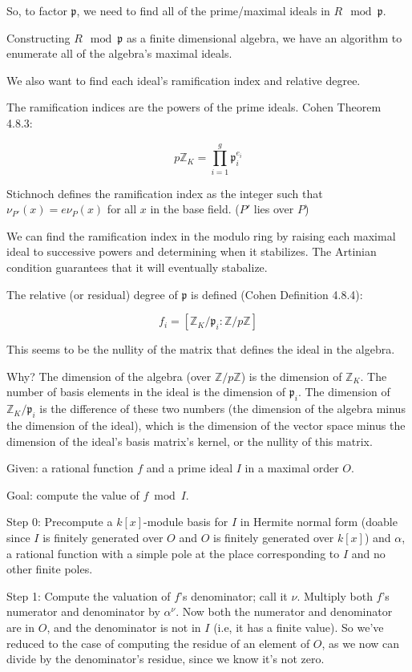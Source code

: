 So, to factor $\mathfrak{p}$, we need to find all of the prime/maximal ideals
in $R \mod \mathfrak{p}$.

Constructing $R \mod \mathfrak{p}$ as a finite dimensional algebra,
we have an algorithm to enumerate all of the algebra's maximal ideals.

We also want to find each ideal's ramification index and relative degree.

The ramification indices are the powers of the prime ideals.  Cohen Theorem 4.8.3:

$$p {\mathbb Z}_K = \prod_{i=1}^{g} {\mathfrak p}_i^{e_i}$$

Stichnoch defines the ramification index as the integer such
that $\nu_{P'}(x) = e \nu_P(x)$ for all $x$ in the base field.
($P'$ lies over $P$)

We can find the ramification index in the modulo ring by raising each maximal
ideal to successive powers and determining when it stabilizes.  The Artinian
condition guarantees that it will eventually stabalize.

The relative (or residual) degree of ${\mathfrak p}$ is defined (Cohen Definition 4.8.4):

$$f_i = [{\mathbb Z}_K/{\mathfrak p}_i : {\mathbb Z}/p{\mathbb Z}]$$

This seems to be the nullity of the matrix that defines the ideal in the algebra.

Why?  The dimension of the algebra (over ${\mathbb Z}/p{\mathbb Z}$)
is the dimension of ${\mathbb Z}_K$.  The number of basis elements in
the ideal is the dimension of ${\mathfrak p}_i$.  The dimension of
${\mathbb Z}_K/{\mathfrak p}_i$ is the difference of these two numbers
(the dimension of the algebra minus the dimension of the ideal), which
is the dimension of the vector space minus the dimension of the
ideal's basis matrix's kernel, or the nullity of this matrix.

\vfill\eject
{}

Given: a rational function $f$ and a prime ideal $I$ in a maximal order $O$.

Goal: compute the value of $f \bmod I$.

Step 0: Precompute a $k[x]$-module basis for $I$ in Hermite normal form (doable since $I$ is finitely generated over $O$ and $O$ is finitely generated over $k[x]$) and $\alpha$, a rational function with a simple pole at the place corresponding to $I$ and no other finite poles.

Step 1: Compute the valuation of $f$'s denominator; call it $\nu$.  Multiply both $f$'s numerator and denominator by $\alpha^\nu$.  Now both the numerator and denominator are in $O$, and the denominator is not in $I$ (i.e, it has a finite value).  So we've reduced to the case of computing the residue of an element of $O$, as we now can divide by the denominator's residue, since we know it's not zero.

